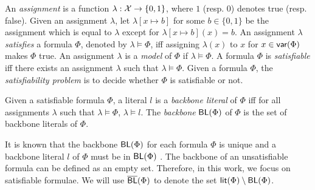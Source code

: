 An \emph{assignment} is a function $\lambda: \mathcal{X} \rightarrow \{0,1\}$, where $1$ (resp. $0$) denotes true (resp. false).
Given an assignment $\lambda$, let $\lambda[x\mapsto b]$ for some $b\in \{0,1\}$ be the assignment which is equal to $\lambda$
except for $\lambda[x\mapsto b](x)=b$.
An assignment $\lambda$ \emph{satisfies} a formula $\Phi$, denoted by $\lambda\models \Phi$, iff assigning $\lambda(x)$ to $x$ for $x\in\textsf{var}(\Phi)$ makes $\Phi$ true. An assignment $\lambda$ is a \emph{model} of $\Phi$ if $\lambda\models \Phi$.
A formula $\Phi$ is \emph{satisfiable} iff there exists an assignment $\lambda$ such that $\lambda\models \Phi$.
Given a formula $\Phi$, the \emph{satisfiability problem} is to decide whether $\Phi$ is satisfiable or not.

\smallskip

\begin{definition}[Backbone]
\label{def:backbone}
Given a satisfiable formula $\Phi$, a literal $l$ is a \emph{backbone literal} of $\Phi$ iff for all assignments $\lambda$ such that $\lambda\models\Phi$,
$\lambda\models l$. The \emph{backbone} $\textsf{BL}(\Phi)$ of $\Phi$ is the set of backbone literals of $\Phi$.
\end{definition}



It is known that the backbone $\textsf{BL}(\Phi)$ for each formula $\Phi$ is unique and a backbone literal $l$ of $\Phi$ must be in
$\textsf{BL}(\Phi)$ \cite{JLM15}.
The backbone of an unsatisfiable formula can be defined as an empty set. Therefore, in this work, we focus on satisfiable formulae.
We will use $\overline{\textsf{BL}}(\Phi)$ to denote the set
$\textsf{lit}(\Phi)\setminus \textsf{BL}(\Phi)$.

